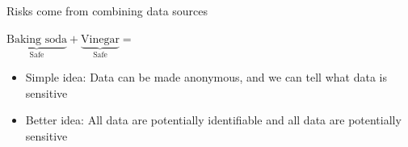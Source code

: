 \documentclass{beamer}
\def\vf{\vfill}
\begin{document}
\begin{frame}

Risks come from combining data sources\\
\vf
\begin{minipage}[c]{0.35\textwidth}
$\underbrace{\text{Baking soda}}_{\text{Safe}} + \underbrace{\text{Vinegar}}_{\text{Safe}} =$
\end{minipage}
\hspace{0.05\textwidth}
\begin{minipage}[c]{0.55\textwidth}
\end{minipage}

\end{frame}
\begin{frame}

\begin{itemize}
\item Simple idea: Data can be made anonymous, and we can tell what data is sensitive
\pause
\item Better idea: All data are potentially identifiable and all data are potentially sensitive
\end{itemize}

\end{frame}
\end{document}
